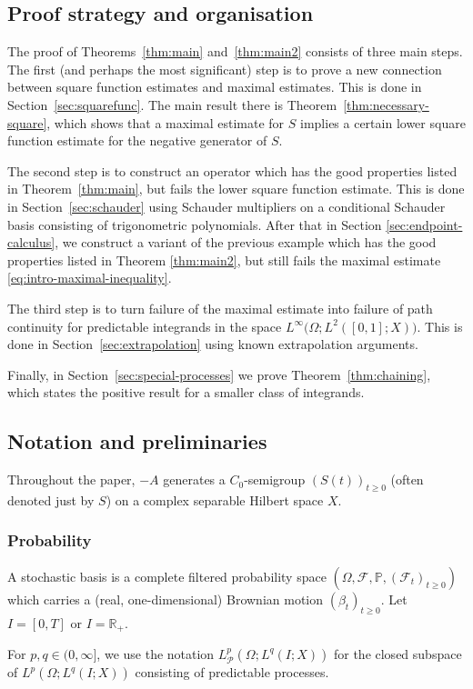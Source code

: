 \documentclass[11pt]{amsart}
\theoremstyle{definition}
\theoremstyle{remark}
\numberwithin{equation}{section}
\newcommand{\F}{\mathscr F}
\renewcommand{\P}{\mathbb P}
\newcommand{\cP}{\mathcal P}
\newcommand{\R}{\mathbb R}
\newcommand{\1}{\mathbf 1}
\begin{document}
\subsection{Proof strategy and organisation}
The proof of Theorems~\ref{thm:main} and~\ref{thm:main2} consists of three main steps.
The first (and perhaps the most significant) step is to prove a new connection between square function estimates and maximal estimates. This is done in Section~\ref{sec:squarefunc}.
The main result there is Theorem~\ref{thm:necessary-square}, which shows that a maximal estimate for $S$ implies a certain lower square function estimate for the negative generator of $S$.

The second step is to construct an operator which has the good properties listed in Theorem~\ref{thm:main}, but fails the lower square function estimate.
This is done in Section~\ref{sec:schauder} using Schauder multipliers on a conditional Schauder basis consisting of trigonometric polynomials.
After that in Section \ref{sec:endpoint-calculus}, we construct a variant of the previous example which has the good properties listed in  Theorem \ref{thm:main2}, but still fails the maximal estimate \eqref{eq:intro-maximal-inequality}. 

The third step is to turn failure of the maximal estimate into failure of path continuity for predictable integrands in the space $L^\infty\bigl(\Omega;L^2([0,1];X)\bigr)$.
This is done in Section~\ref{sec:extrapolation} using known extrapolation arguments.

Finally, in Section~\ref{sec:special-processes} we prove Theorem~\ref{thm:chaining}, which states the positive result for a smaller class of integrands.

\subsection{Notation and preliminaries}
Throughout the paper, $-A$ generates a $C_0$-semigroup $(S(t))_{t \geq 0}$ (often denoted just by $S$) on a complex separable Hilbert space $X$. 


\subsubsection{Probability}
A stochastic basis is a complete filtered probability space $(\Omega, \F, \P, (\F_t)_{t \geq 0})$ which carries a (real, one-dimensional) Brownian motion $(\beta_t)_{t \geq 0}$. Let $I = [0,T]$ or $I=\R_+$. 

For $p,q \in (0,\infty]$, we use the notation $L^p_{\cP}(\Omega;L^q(I;X))$ for the closed subspace of $L^p(\Omega;L^q(I;X))$ consisting of predictable processes.
\end{document}
